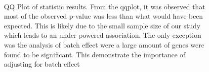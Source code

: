 \begin{figure}
{		\label{fig:omegaSALWald}
	}\\
	\caption[QQ Plot Statistic Results]
	{QQ Plot of statistic results.
		From the \gls{qqplot}, it was observed that most of the observed p-value was less than what would have been expected. 
		This is likely due to the small sample size of our study which leads to an under powered association.
		The only exception was the analysis of batch effect were a large amount of genes were found to be significant. 
		This demonstrate the importance of adjusting for batch effect} 
	\label{fig:waldQQ}
\end{figure}
